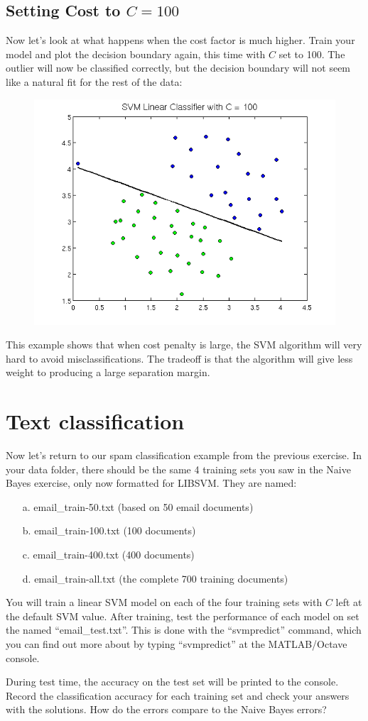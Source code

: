 \documentclass[10pt,a4paper]{article}
\begin{document}
  \subsection{Setting Cost to $C=100$}
  Now let's look at what happens when the cost factor is much higher. Train your model and plot the decision boundary again, this time with $C$ set to 100. The outlier will now be classified correctly, but the decision boundary will not seem like a natural fit for the rest of the data:
  \begin{figure}[htb!]
    \centering
      \includegraphics[width=.7\columnwidth]{twofeature_b}
  \end{figure}
  This example shows that when cost penalty is large, the SVM algorithm will very hard to avoid misclassifications. The tradeoff is that the algorithm will give less weight to producing a large separation margin.



\section{Text classification}
%
  Now let's return to our spam classification example from the previous exercise. In your data folder, there should be the same 4 training sets you saw in the Naive Bayes exercise, only now formatted for LIBSVM. They are named:
  \begin{itemize}
    \item[a.] email\_train-50.txt (based on 50 email documents)
    \item[b.] email\_train-100.txt (100 documents)
    \item[c.] email\_train-400.txt (400 documents)
    \item[d.] email\_train-all.txt (the complete 700 training documents)
  \end{itemize}

  You will train a linear SVM model on each of the four training sets with  $C$ left at the default SVM value. After training, test the performance of each model on set the named ``email\_test.txt''. This is done with the ``svmpredict'' command, which you can find out more about by typing ``svmpredict'' at the MATLAB/Octave console.

  During test time, the accuracy on the test set will be printed to the console. Record the classification accuracy for each training set and check your answers with the solutions. How do the errors compare to the Naive Bayes errors?
\end{document}
